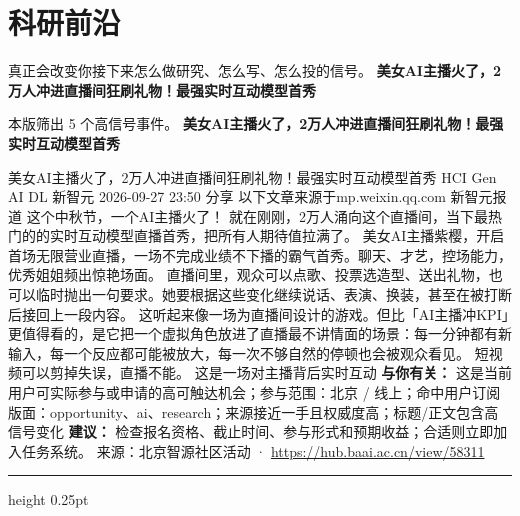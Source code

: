 \documentclass[10.5pt]{ctexart}
\begin{document}
\section*{科研前沿}
{\color{ormuted} 真正会改变你接下来怎么做研究、怎么写、怎么投的信号。}
\vspace{2mm}
{\LARGE\bfseries 美女AI主播火了，2万人冲进直播间狂刷礼物！最强实时互动模型首秀}\par
\vspace{1mm}
{\color{ormuted} 本版筛出 5 个高信号事件。}
\vspace{3mm}
{\Large\bfseries 美女AI主播火了，2万人冲进直播间狂刷礼物！最强实时互动模型首秀}\par
美女AI主播火了，2万人冲进直播间狂刷礼物！最强实时互动模型首秀 HCI Gen AI DL 新智元 2026-09-27 23:50 分享 以下文章来源于mp.weixin.qq.com 新智元报道 这个中秋节，一个AI主播火了！ 就在刚刚，2万人涌向这个直播间，当下最热门的的实时互动模型直播首秀，把所有人期待值拉满了。 美女AI主播紫樱，开启首场无限营业直播，一场不完成业绩不下播的霸气首秀。聊天、才艺，控场能力，优秀姐姐频出惊艳场面。 直播间里，观众可以点歌、投票选造型、送出礼物，也可以临时抛出一句要求。她要根据这些变化继续说话、表演、换装，甚至在被打断后接回上一段内容。 这听起来像一场为直播间设计的游戏。但比「AI主播冲KPI」更值得看的，是它把一个虚拟角色放进了直播最不讲情面的场景：每一分钟都有新输入，每一个反应都可能被放大，每一次不够自然的停顿也会被观众看见。 短视频可以剪掉失误，直播不能。 这是一场对主播背后实时互动
\textbf{与你有关：} 这是当前用户可实际参与或申请的高可触达机会；参与范围：北京 / 线上；命中用户订阅版面：opportunity、ai、research；来源接近一手且权威度高；标题/正文包含高信号变化
\textbf{建议：} 检查报名资格、截止时间、参与形式和预期收益；合适则立即加入任务系统。
{\footnotesize\color{ormuted} 来源：北京智源社区活动 · \url{https://hub.baai.ac.cn/view/58311}}
\vspace{4mm}
\hrule height 0.25pt
\vspace{3mm}
\end{document}
